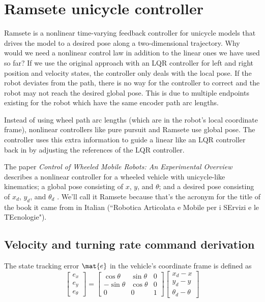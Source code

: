 \section{Ramsete unicycle controller}
\label{sec:ramsete_unicycle_controller}

Ramsete is a nonlinear time-varying feedback controller for unicycle
\glspl{model} that drives the \gls{model} to a desired \gls{pose} along a
two-dimensional trajectory. Why would we need a nonlinear control law in
addition to the linear ones we have used so far? If we use the original approach
with an LQR \gls{controller} for left and right position and velocity
\glspl{state}, the \gls{controller} only deals with the local \gls{pose}. If the
robot deviates from the path, there is no way for the \gls{controller} to
correct and the robot may not reach the desired global \gls{pose}. This is due
to multiple endpoints existing for the robot which have the same encoder path
arc lengths.

Instead of using wheel path arc lengths (which are in the robot's local
coordinate frame), nonlinear controllers like pure pursuit and Ramsete use
global pose. The \gls{controller} uses this extra information to guide a linear
 like an LQR \gls{controller} back in by
adjusting the \glspl{reference} of the LQR \gls{controller}.

The paper \textit{Control of Wheeled Mobile Robots: An Experimental Overview}
describes a nonlinear controller for a wheeled vehicle with unicycle-like
kinematics; a global \gls{pose} consisting of $x$, $y$, and $\theta$; and a
desired \gls{pose} consisting of $x_d$, $y_d$, and $\theta_d$
\cite{bib:ctrl_wheeled_mobile_robots}. We'll call it Ramsete because that's the
acronym for the title of the book it came from in Italian (``Robotica Articolata
e Mobile per i SErvizi e le TEcnologie").

\subsection{Velocity and turning rate command derivation}

The \gls{state} tracking \gls{error} $\mat{e}$ in the vehicle's coordinate frame
is defined as
\begin{equation*}
  \begin{bmatrix}
    e_x \\
    e_y \\
    e_\theta
  \end{bmatrix} =
  \begin{bmatrix}
    \cos\theta & \sin\theta & 0 \\
    -\sin\theta & \cos\theta & 0 \\
    0 & 0 & 1
  \end{bmatrix}
  \begin{bmatrix}
    x_d - x \\
    y_d - y \\
    \theta_d - \theta
  \end{bmatrix}
\end{equation*}

